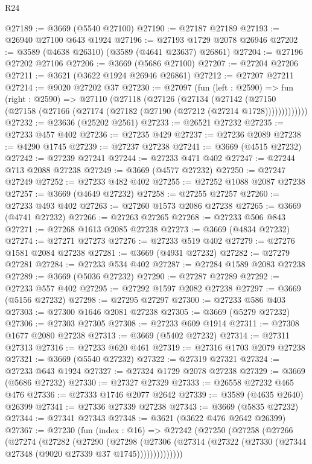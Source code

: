 \begin{lexlean}{R24}
\begin{coremodule}
@27189 := @3669 (@5540 @27100)
@27190 := @27187 @27189
@27193 := @26940 @27100 @643 @1924
@27196 := @27193 @1729 @2078 @26946
@27202 := @3589 (@4638 @26310) (@3589 (@4641 @23637) @26861)
@27204 := @27196 @27202 @27106
@27206 := @3669 (@5686 @27100)
@27207 := @27204 @27206
@27211 := @3621 (@3622 @1924 @26946 @26861)
@27212 := @27207 @27211
@27214 := @9020 @27202 @37
@27230 := @27097
    (fun (left : @2590) =>
    fun (right : @2590) =>
    @27110
      (@27118
        (@27126
          (@27134
            (@27142
              (@27150 (@27158 (@27166 (@27174 (@27182 (@27190 (@27212 (@27214 @1728)))))))))))))
@27232 := @23636 (@25202 @2561)
@27233 := @26521 @27232
@27235 := @27233 @457 @402
@27236 := @27235 @429
@27237 := @27236 @2089
@27238 := @4290 @1745
@27239 := @27237 @27238
@27241 := @3669 (@4515 @27232)
@27242 := @27239 @27241
@27244 := @27233 @471 @402
@27247 := @27244 @713 @2088 @27238
@27249 := @3669 (@4577 @27232)
@27250 := @27247 @27249
@27252 := @27233 @482 @402
@27255 := @27252 @1088 @2087 @27238
@27257 := @3669 (@4649 @27232)
@27258 := @27255 @27257
@27260 := @27233 @493 @402
@27263 := @27260 @1573 @2086 @27238
@27265 := @3669 (@4741 @27232)
@27266 := @27263 @27265
@27268 := @27233 @506 @843
@27271 := @27268 @1613 @2085 @27238
@27273 := @3669 (@4834 @27232)
@27274 := @27271 @27273
@27276 := @27233 @519 @402
@27279 := @27276 @1581 @2084 @27238
@27281 := @3669 (@4931 @27232)
@27282 := @27279 @27281
@27284 := @27233 @534 @402
@27287 := @27284 @1589 @2083 @27238
@27289 := @3669 (@5036 @27232)
@27290 := @27287 @27289
@27292 := @27233 @557 @402
@27295 := @27292 @1597 @2082 @27238
@27297 := @3669 (@5156 @27232)
@27298 := @27295 @27297
@27300 := @27233 @586 @403
@27303 := @27300 @1646 @2081 @27238
@27305 := @3669 (@5279 @27232)
@27306 := @27303 @27305
@27308 := @27233 @609 @1914
@27311 := @27308 @1677 @2080 @27238
@27313 := @3669 (@5402 @27232)
@27314 := @27311 @27313
@27316 := @27233 @620 @461
@27319 := @27316 @1703 @2079 @27238
@27321 := @3669 (@5540 @27232)
@27322 := @27319 @27321
@27324 := @27233 @643 @1924
@27327 := @27324 @1729 @2078 @27238
@27329 := @3669 (@5686 @27232)
@27330 := @27327 @27329
@27333 := @26558 @27232 @465 @476
@27336 := @27333 @1746 @2077 @2642
@27339 := @3589 (@4635 @2640) @26399
@27341 := @27336 @27339 @27238
@27343 := @3669 (@5835 @27232)
@27344 := @27341 @27343
@27348 := @3621 (@3622 @476 @2642 @26399)
@27367 := @27230
    (fun (index : @16) =>
    @27242
      (@27250
        (@27258
          (@27266
            (@27274
              (@27282
                (@27290
                  (@27298
                    (@27306
                      (@27314 (@27322 (@27330 (@27344 @27348 (@9020 @27339 @37 @1745))))))))))))))

\end{coremodule}
\end{lexlean}
